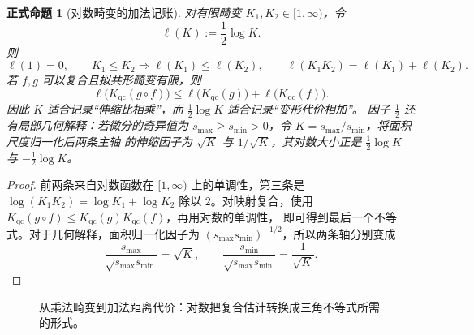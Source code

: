 \documentclass[UTF8,fontset=none,a4paper,11pt]{ctexart}
\theoremstyle{foundation-definition}
\theoremstyle{foundation-theorem}
\theoremstyle{foundation-proposition}
\newtheorem{proposition}[definition]{正式命题}
\theoremstyle{foundation-example}
\theoremstyle{foundation-remark}
\theoremstyle{foundation-theorem}
\begin{document}
\begin{proposition}[对数畸变的加法记账]\label{prop:log-distortion-additivity}
对有限畸变 \(K_1,K_2\in[1,\infty)\)，令
\[
\ell(K):=\frac12\log K.
\]
则
\[
\ell(1)=0,\qquad
K_1\leq K_2\Longrightarrow\ell(K_1)\leq\ell(K_2),\qquad
\ell(K_1K_2)=\ell(K_1)+\ell(K_2).
\]
若 \(f,g\) 可以复合且拟共形畸变有限，则
\[
\ell\bigl(K_{\mathrm{qc}}(g\circ f)\bigr)
\leq
\ell\bigl(K_{\mathrm{qc}}(g)\bigr)+
\ell\bigl(K_{\mathrm{qc}}(f)\bigr).
\]
因此 \(K\) 适合记录“伸缩比相乘”，而 \(\frac12\log K\) 适合记录“变形代价相加”。
因子 \(\frac12\) 还有局部几何解释：若微分的奇异值为
\(s_{\max}\geq s_{\min}>0\)，令 \(K=s_{\max}/s_{\min}\)，将面积尺度归一化后两条主轴
的伸缩因子为 \(\sqrt K\) 与 \(1/\sqrt K\)，其对数大小正是
\(\frac12\log K\) 与 \(-\frac12\log K\)。
\end{proposition}

\begin{proof}
前两条来自对数函数在 \([1,\infty)\) 上的单调性，第三条是
\(\log(K_1K_2)=\log K_1+\log K_2\) 除以 \(2\)。对映射复合，使用
\(K_{\mathrm{qc}}(g\circ f)\leq K_{\mathrm{qc}}(g)K_{\mathrm{qc}}(f)\)，再用对数的单调性，
即可得到最后一个不等式。对于几何解释，面积归一化因子为
\((s_{\max}s_{\min})^{-1/2}\)，所以两条轴分别变成
\[
\frac{s_{\max}}{\sqrt{s_{\max}s_{\min}}}=\sqrt K,\qquad
\frac{s_{\min}}{\sqrt{s_{\max}s_{\min}}}=\frac1{\sqrt K}.
\]
\end{proof}

\begin{figure}[htbp]
\centering
{}
\caption{从乘法畸变到加法距离代价：对数把复合估计转换成三角不等式所需的形式。}
\label{fig:log-distortion-accounting}
\end{figure}
\end{document}
